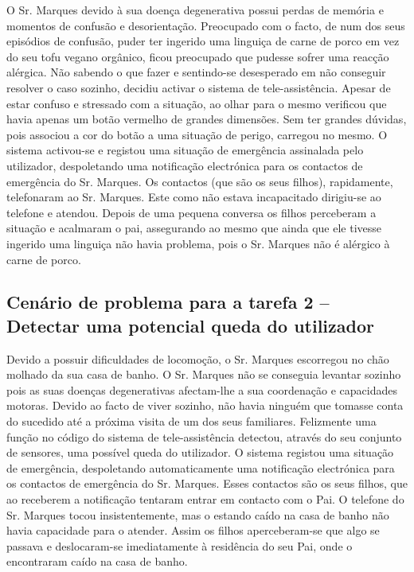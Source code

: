 O Sr. Marques devido à sua doença degenerativa possui perdas de memória e momentos de confusão e desorientação. Preocupado com o facto, de num dos seus episódios de confusão, puder ter ingerido uma linguiça de carne de porco em vez do seu tofu vegano orgânico, ficou preocupado que pudesse sofrer uma reacção alérgica. Não sabendo o que fazer e sentindo-se desesperado em não conseguir resolver o caso sozinho, decidiu activar o sistema de tele-assistência. Apesar de estar confuso e stressado com a situação, ao olhar para o mesmo verificou que havia apenas um botão vermelho de grandes dimensões. Sem ter grandes dúvidas, pois associou a cor do botão a uma situação de perigo, carregou no mesmo.
O sistema activou-se e registou uma situação de emergência assinalada pelo utilizador, despoletando uma notificação electrónica para os contactos de emergência do Sr. Marques.
Os contactos (que são os seus filhos), rapidamente, telefonaram ao Sr. Marques. Este como não estava incapacitado dirigiu-se ao telefone e atendou. Depois de uma pequena conversa os filhos perceberam a situação e acalmaram o pai, assegurando ao mesmo que ainda que ele tivesse ingerido uma linguiça não havia problema, pois o Sr. Marques não é alérgico à carne de porco.


\subsection{Cenário de problema para a tarefa 2 – Detectar uma potencial queda do utilizador}

Devido a possuir dificuldades de locomoção, o Sr. Marques escorregou no chão molhado da sua casa de banho. O Sr. Marques não se conseguia levantar sozinho pois as suas doenças degenerativas afectam-lhe a sua coordenação e capacidades motoras.
Devido ao facto de viver sozinho, não havia ninguém que tomasse conta do sucedido até a próxima visita de um dos seus familiares. Felizmente uma função no código do sistema de tele-assistência detectou, através do seu conjunto de sensores, uma possível queda do utilizador.
O sistema registou uma situação de emergência, despoletando automaticamente uma notificação electrónica para os contactos de emergência do Sr. Marques.
Esses contactos são os seus filhos, que ao receberem a notificação tentaram entrar em contacto com o Pai. O telefone do Sr. Marques tocou insistentemente, mas o estando caído na casa de banho não havia capacidade para o atender. Assim os filhos aperceberam-se que algo se passava e deslocaram-se imediatamente à residência do seu Pai, onde o encontraram caído na casa de banho. 


